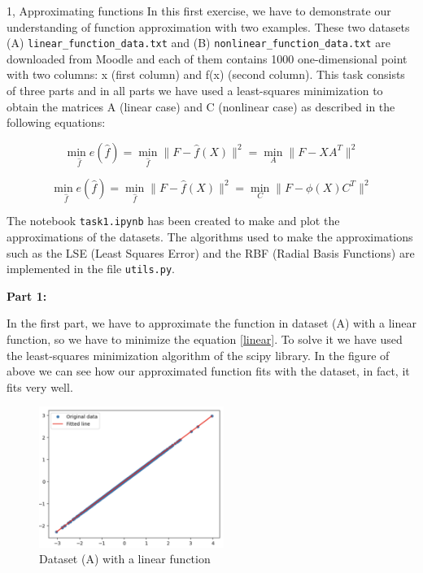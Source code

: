 \documentclass[10pt,a4paper]{article}
\begin{document}
\frontpage

\begin{task}{1, Approximating functions}
In this first exercise, we have to demonstrate our understanding of function approximation with two examples. These two datasets (A) \texttt{linear\_function\_data.txt} and (B) \texttt{nonlinear\_function\_data.txt} are downloaded from Moodle and each of them contains 1000 one-dimensional point with two columns: x (first column) and f(x) (second column). This task consists of three parts and in all parts we have used a least-squares minimization to obtain the matrices A (linear case) and C (nonlinear case) as described in the following equations:

\begin{equation}\label{linear}
    \underset{\hat{f}}{\min e} (\hat{f}) = \underset{\hat{f}}{\min } \| F - \hat{f}(X)\|^2 = \underset{A}{\min } \| F - XA^T\|^2
\end{equation}

\begin{equation}\label{nonlinear}
    \underset{\hat{f}}{\min e} (\hat{f}) = \underset{\hat{f}}{\min } \| F - \hat{f}(X)\|^2 = \underset{C}{\min } \| F - \phi(X)C^T\|^2
\end{equation}

The notebook \texttt{task1.ipynb} has been created to make and plot the approximations of the datasets. The algorithms used to make the approximations such as the LSE (Least Squares Error) and the RBF (Radial Basis Functions) are implemented in the file \texttt{utils.py}.

\bigskip

\noindent \textbf{Part 1:} 

In the first part, we have to approximate the function in dataset (A) with a linear function, so we have to minimize the equation \ref{linear}. To solve it we have used the least-squares minimization algorithm of the scipy library. In the figure of above we can see how our approximated function fits with the dataset, in fact, it fits very well.

\begin{figure}[H]
    \centering
    \includegraphics[width=6cm]{images/linearFunctionA.png}
    \caption{Dataset (A) with a linear function}
    \label{linearA}
\end{figure}


\end{task}
\end{document}
